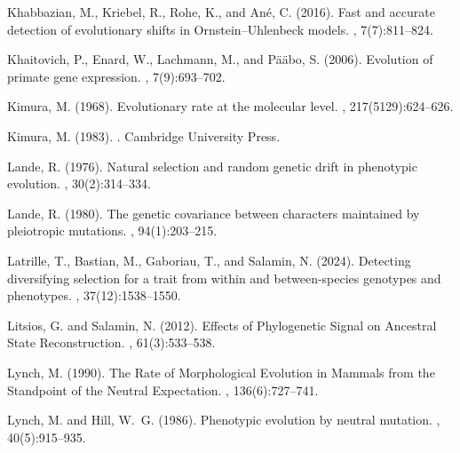 \documentclass{article}
\begin{document}
\begin{thebibliography}{}
Khabbazian, M., Kriebel, R., Rohe, K., and An{\'e}, C. (2016).
\newblock Fast and accurate detection of evolutionary shifts in
  {{Ornstein}}--{{Uhlenbeck}} models.
, 7(7):811--824.

Khaitovich, P., Enard, W., Lachmann, M., and P{\"a}{\"a}bo, S. (2006).
\newblock Evolution of primate gene expression.
, 7(9):693--702.

Kimura, M. (1968).
\newblock Evolutionary rate at the molecular level.
, 217(5129):624--626.

Kimura, M. (1983).
.
\newblock Cambridge University Press.

Lande, R. (1976).
\newblock Natural selection and random genetic drift in phenotypic evolution.
, 30(2):314--334.

Lande, R. (1980).
\newblock The genetic covariance between characters maintained by pleiotropic
  mutations.
, 94(1):203--215.

Latrille, T., Bastian, M., Gaboriau, T., and Salamin, N. (2024).
\newblock Detecting diversifying selection for a trait from within and
  between-species genotypes and phenotypes.
, 37(12):1538--1550.

Litsios, G. and Salamin, N. (2012).
\newblock Effects of {{Phylogenetic Signal}} on {{Ancestral State
  Reconstruction}}.
, 61(3):533--538.

Lynch, M. (1990).
\newblock The {{Rate}} of {{Morphological Evolution}} in {{Mammals}} from the
  {{Standpoint}} of the {{Neutral Expectation}}.
, 136(6):727--741.

Lynch, M. and Hill, W.~G. (1986).
\newblock Phenotypic evolution by neutral mutation.
, 40(5):915--935.


\end{thebibliography}
\end{document}
